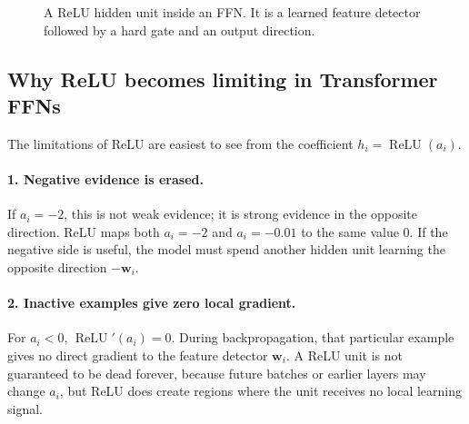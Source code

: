 \documentclass[11pt,a4paper]{article}
\theoremstyle{definition}
\theoremstyle{plain}
\newcommand{\vx}{\bm{x}}
\newcommand{\vu}{\bm{u}}
\newcommand{\vw}{\bm{w}}
\DeclareMathOperator{\ReLU}{ReLU}
\begin{document}
\begin{figure}[H]
\centering
{}
\caption{A ReLU hidden unit inside an FFN. It is a learned feature detector followed by a hard gate and an output direction.}
\label{fig:relu-hidden-unit}
\end{figure}

\subsection{Why ReLU becomes limiting in Transformer FFNs}

The limitations of ReLU are easiest to see from the coefficient $h_i=\ReLU(a_i)$.

\paragraph{1. Negative evidence is erased.}
If $a_i=-2$, this is not weak evidence; it is strong evidence in the opposite direction. ReLU maps both $a_i=-2$ and $a_i=-0.01$ to the same value $0$. If the negative side is useful, the model must spend another hidden unit learning the opposite direction $-\vw_i$.

\paragraph{2. Inactive examples give zero local gradient.}
For $a_i<0$, $\ReLU'(a_i)=0$. During backpropagation, that particular example gives no direct gradient to the feature detector $\vw_i$. A ReLU unit is not guaranteed to be dead forever, because future batches or earlier layers may change $a_i$, but ReLU does create regions where the unit receives no local learning signal.
\end{document}
